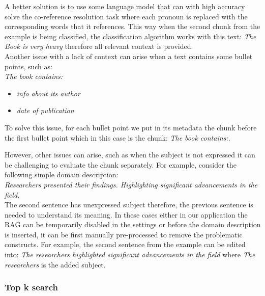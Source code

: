 A better solution is to use some language model that can with high accuracy solve the co-reference resolution task where each pronoun is replaced with the corresponding words that it references. This way when the second chunk from the example is being classified, the classification algorithm works with this text: \textit{The Book is very heavy} therefore all relevant context is provided. \\

Another issue with a lack of context can arise when a text contains some bullet points, such as: \\

\noindent{}\textit{The book contains:}
\begin{itemize}
\item \textit{info about its author}
\item \textit{date of publication} \\
\end{itemize}

\noindent{}To solve this issue, for each bullet point we put in its metadata the chunk before the first bullet point which in this case is the chunk: \textit{The book contains:}.

However, other issues can arise, such as when the subject is not expressed it can be challenging to evaluate the chunk separately. For example, consider the following simple domain description: \\

\noindent{}\textit{Researchers presented their findings. Highlighting significant advancements in the field.} \\

\noindent{}The second sentence has unexpressed subject therefore, the previous sentence is needed to understand its meaning. In these cases either in our application the RAG can be temporarily disabled in the settings or before the domain description is inserted, it can be first manually pre-processed to remove the problematic constructs. For example, the second sentence from the example can be edited into: \textit{The researchers highlighted significant advancements in the field} where \textit{The researchers} is the added subject.


\subsubsection{Top k search}
\label{sec:top_k_search}

